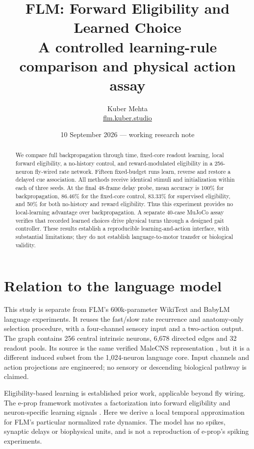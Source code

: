 \documentclass[10pt]{article}
\title{\textbf{FLM: Forward Eligibility and Learned Choice}\\[6pt]\large A controlled learning-rule comparison and physical action assay}
\author{Kuber Mehta\\\href{https://flm.kuber.studio}{flm.kuber.studio}}
\date{10 September 2026 --- working research note}
\begin{document}
\maketitle
\begin{abstract}
We compare full backpropagation through time, fixed-core readout learning, local forward eligibility, a no-history control, and reward-modulated eligibility in a 256-neuron fly-wired rate network. Fifteen fixed-budget runs learn, reverse and restore a delayed cue association. All methods receive identical stimuli and initialization within each of three seeds. At the final 48-frame delay probe, mean accuracy is 100\% for backpropagation, 86.46\% for the fixed-core control, 83.33\% for supervised eligibility, and 50\% for both no-history and reward eligibility. Thus this experiment provides no local-learning advantage over backpropagation. A separate 40-case MuJoCo assay verifies that recorded learned choices drive physical turns through a designed gait controller. These results establish a reproducible learning-and-action interface, with substantial limitations; they do not establish language-to-motor transfer or biological validity.
\end{abstract}

\section{Relation to the language model}
This study is separate from FLM's 600k-parameter WikiText and BabyLM language experiments. It reuses the fast/slow rate recurrence and anatomy-only selection procedure, with a four-channel sensory input and a two-action output. The graph contains 256 central intrinsic neurons, 6,678 directed edges and 32 readout pools. Its source is the same verified MaleCNS representation \cite{malecns}, but it is a different induced subset from the 1,024-neuron language core. Input channels and action projections are engineered; no sensory or descending biological pathway is claimed.

Eligibility-based learning is established prior work, applicable beyond fly wiring. The e-prop framework motivates a factorization into forward eligibility and neuron-specific learning signals \cite{bellec}. Here we derive a local temporal approximation for FLM's particular normalized rate dynamics. The model has no spikes, synaptic delays or biophysical units, and is not a reproduction of e-prop's spiking experiments.
\end{document}
